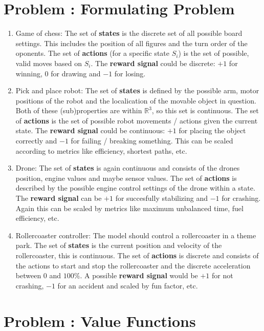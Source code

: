 \documentclass[12pt]{scrartcl}
\newcounter{exnum}
\newcommand{\exercise}[1]{\section*{Problem \theexnum\stepcounter{exnum}: #1}}
\begin{document}
\setcounter{exnum}{1}

\exercise{Formulating Problem}

\begin{enumerate}
  \item Game of chess: The set of \textbf{states} is the discrete set of all possible board settings. This includes the position of all figures and the turn order of the oponents.
        The set of \textbf{actions} (for a specific state $S_i$) is the set of possible, valid moves based on $S_i$.
        The \textbf{reward signal} could be discrete: $+1$ for winning, $0$ for drawing and $-1$ for losing.
  \item Pick and place robot: The set of \textbf{states} is defined by the possible arm, motor positions of the robot and the localication of the movable object in question.
        Both of these (sub)properties are within $\mathbb{R}^3$, so this set is continuous.
        The set of \textbf{actions} is the set of possible robot movements / actions given the current state.
        The \textbf{reward signal} could be continuous: $+1$ for placing the object correctly and $-1$ for failing / breaking something. This can be scaled according to metrics like efficiency, shortest paths, etc.
  \item Drone: The set of \textbf{states} is again continuous and consists of the drones position, engine values and maybe sensor values.
        The set of \textbf{actions} is described by the possible engine control settings of the drone within a state.
        The \textbf{reward signal} can be $+1$ for succesfully stabilizing and $-1$ for crashing. Again this can be scaled by metrics like maximum unbalanced time, fuel efficiency, etc.
  \item Rollercoaster controller: The model should control a rollercoaster in a theme park.
        The set of \textbf{states} is the current position and velocity of the rollercoaster, this is continuous.
        The set of \textbf{actions} is discrete and consists of the actions to start and stop the rollercoaster and the discrete acceleration between $0$ and $100\%$.
        A possible \textbf{reward signal} would be $+1$ for not crashing, $-1$ for an accident and scaled by fun factor, etc.
\end{enumerate}

\exercise{Value Functions}
\end{document}

